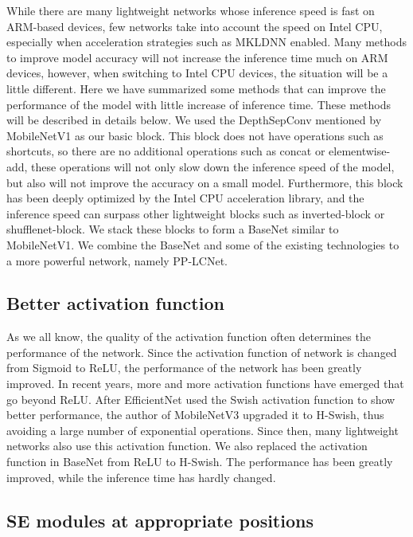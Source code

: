 \documentclass[final]{cvpr}
\begin{document}
While there are many lightweight networks whose inference speed is fast on ARM-based devices, few networks take into account the speed on Intel CPU, especially when acceleration strategies such as MKLDNN enabled. Many methods to improve model accuracy will not increase the inference time much on ARM devices, however, when 
switching to Intel CPU devices, the situation will be a little different. Here we have summarized some methods that can improve the performance of the model with little increase of inference time. These methods will be described in details below. We used the DepthSepConv mentioned by MobileNetV1\cite{mobilenetv1} as our basic block. This block does not have operations such as shortcuts, so there are no additional operations such as concat or elementwise-add, these operations will not only slow down the inference speed of the model, but also will not improve the accuracy on a small model. 
Furthermore, this block has been deeply optimized by the Intel CPU acceleration library, and the inference speed can surpass other lightweight blocks such as inverted-block or shufflenet-block. We stack these blocks to form a BaseNet similar to MobileNetV1\cite{mobilenetv1}. We combine the BaseNet and some of the existing technologies to a more powerful network, namely PP-LCNet.

\subsection{Better activation function}

As we all know, the quality of the activation function often determines the performance of the network. Since the activation function of network is changed from Sigmoid to ReLU, the performance of the network has been greatly improved. In recent years, more and more activation functions have emerged that go beyond ReLU. After EfficientNet\cite{efficientnet} used the Swish activation function to show better performance, the author of MobileNetV3\cite{mbv3} upgraded it to H-Swish, thus avoiding a large number of exponential operations. 
Since then, many lightweight networks also use this activation function. We also replaced the activation function in BaseNet from ReLU to H-Swish. The performance has been greatly improved, while the inference time has hardly changed.


\subsection{SE modules at appropriate positions}
\end{document}
